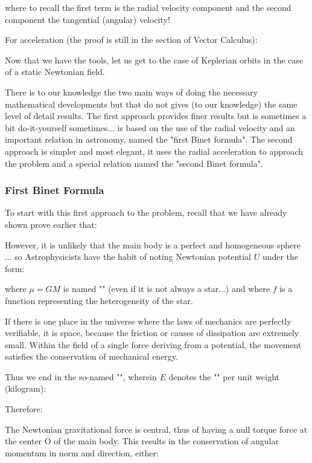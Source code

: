 	where to recall the first term is the radial velocity component and the second component the tangential (angular) velocity!

	For acceleration (the proof is still in the section of Vector Calculus):
	
	Now that we have the tools, let us get to the case of Keplerian orbits in the case of a static Newtonian field.

	There is to our knowledge the two main ways of doing the necessary mathematical developments but that do not gives (to our knowledge) the same level of detail results. The first approach provides finer results but is sometimes a bit do-it-yourself sometimes... is based on the use of the radial velocity and an important relation in astronomy, named the "first Binet formula". The second approach is simpler and most elegant, it uses the radial acceleration to approach the problem and a special relation named the "second Binet formula".
	
	\subsubsection{First Binet Formula}
	To start with this first approach to the problem, recall that we have already shown prove earlier that:
	
	However, it is unlikely that the main body is a perfect and homogeneous sphere ... so Astrophysicists have the habit of noting Newtonian potential $U$ under the form:
	
	where $\mu=GM$ is named "" (even if it is not always a star...) and where $f$ is a function representing the heterogeneity of the star.
	
	If there is one place in the universe where the laws of mechanics are perfectly verifiable, it is space, because the friction or causes of dissipation are extremely small. Within the field of a single force deriving from a potential, the movement satisfies the conservation of mechanical energy.

	Thus we end in the so-named "", wherein $E$ denotes the "" per unit weight (kilogram):
	
	Therefore:
	
	The Newtonian gravitational force is central, thus of having a null torque force at the center O of the main body. This results in the conservation of angular momentum in norm and direction, either:
	
